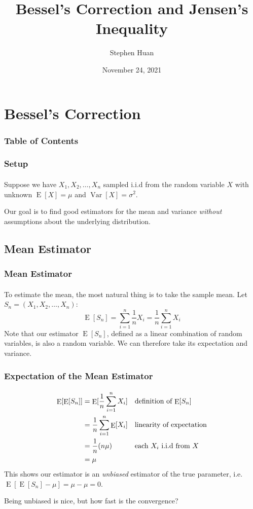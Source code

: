 \documentclass{beamer}                             %
\title[]{Bessel's Correction and Jensen's Inequality}
\subtitle{}
\author[Huan]{Stephen Huan\inst{1}}
\institute[Georgia Institute of Technology]
{
  \inst{1}
  Georgia Institute of Technology 
}
\date[]{November 24, 2021}
\DeclareMathOperator{\E}{E}
\DeclareMathOperator{\Var}{Var}
\begin{document}
\frame{\titlepage}

\section{Bessel's Correction}

\begin{frame}
\frametitle{Table of Contents}
\tableofcontents[currentsection]
\end{frame}

\begin{frame}
\frametitle{Setup}
\framesubtitle{}
Suppose we have \( X_1, X_2, \dots, X_n \) sampled
i.i.d from the random variable \( X \) with unknown
\( \E[X] = \mu \) and \( \Var[X] = \sigma^2 \). \bigskip

Our goal is to find good estimators for the mean and variance
\emph{without} assumptions about the underlying distribution.
\end{frame}

\subsection{Mean Estimator}

\begin{frame}
\frametitle{Mean Estimator}
\framesubtitle{}
To estimate the mean, the most natural thing is to take
the sample mean. Let \( S_n = (X_1, X_2, \dots, X_n) \):
\[ \E[S_n] = \sum_{i = 1}^n \frac{1}{n} X_i = \frac{1}{n} \sum_{i = 1}^n X_i \]
Note that our estimator \( \E[S_n] \), defined as a linear
combination of random variables, is also a random variable.
We can therefore take its expectation and variance.
\end{frame}

\begin{frame}
\frametitle{Expectation of the Mean Estimator}
\framesubtitle{}
\begin{align*}  
  \E[\E[S_n]] &= \E[\frac{1}{n} \sum_{i = 1}^n X_i]
                && \text{definition of \( \E[S_n] \)}\\
              &= \frac{1}{n} \sum_{i = 1}^n \E[X_i]
                && \text{linearity of expectation} \\
              &= \frac{1}{n} (n \mu)
                && \text{each \( X_i \) i.i.d from \( X \)} \\
              &= \mu
\end{align*}
This shows our estimator is an \emph{unbiased} estimator of the
true parameter, i.e. \( \E[\E[S_n] - \mu] = \mu - \mu = 0 \).

Being unbiased is nice, but how fast is the convergence?
\end{frame}
\end{document}
